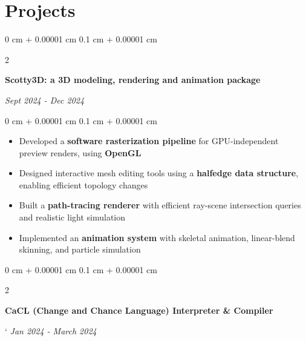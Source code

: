 \documentclass[10pt, letterpaper]{article}
\newenvironment{highlights}{
    \begin{itemize}[
        topsep=0.1 cm,
        parsep=0.10 cm,
        partopsep=0pt,
        itemsep=0pt,
        leftmargin=0.4 cm + 10pt
    ]
}{
    \end{itemize}
} %
\newenvironment{onecolentry}{
    \begin{adjustwidth}{
        0 cm + 0.00001 cm
    }{
        0.1 cm + 0.00001 cm
    }
}{
    \end{adjustwidth}
} %
\newenvironment{twocolentry}[2][]{
    \onecolentry
    \def\secondColumn{#2}
    \setcolumnwidth{\fill, 4.5 cm}
    \begin{paracol}{2}
}{
    \switchcolumn \raggedleft \secondColumn
    \end{paracol}
    \endonecolentry
} %
\begin{document}
    

    
    \section{Projects}


        \begin{twocolentry}{
            
            
        \textit{Sept 2024 - Dec 2024}}
            \textbf{Scotty3D: a 3D modeling, rendering and animation package}
        \end{twocolentry}

        \vspace{0.10 cm}
        \begin{onecolentry}
            \begin{highlights}

\item	Developed a \textbf{software rasterization pipeline} for GPU-independent preview renders, using \textbf{OpenGL} 
\item	Designed interactive mesh editing tools using a \textbf{halfedge data structure}, enabling efficient topology changes 
\item	Built a \textbf{path-tracing renderer} with efficient ray-scene intersection queries and realistic light simulation
\item   Implemented an \textbf{animation system} with skeletal animation, linear-blend skinning, and particle simulation

            \end{highlights}
        \end{onecolentry}




\vspace{0.2 cm}


        \begin{twocolentry}{
            
            `
        \textit{Jan 2024 - March 2024}}
            \textbf{CaCL (Change and Chance Language) Interpreter \& Compiler}
        \end{twocolentry}
\end{document}
